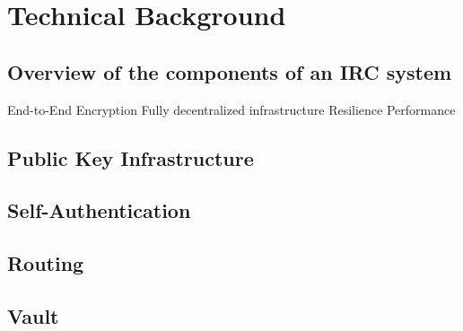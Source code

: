 \chapter{Technical Background}

\section{Overview of the components of an IRC system}
End-to-End Encryption
Fully decentralized infrastructure
Resilience
Performance 

\section{Public Key Infrastructure}

\section{Self-Authentication}

\section{Routing}

\section{Vault}